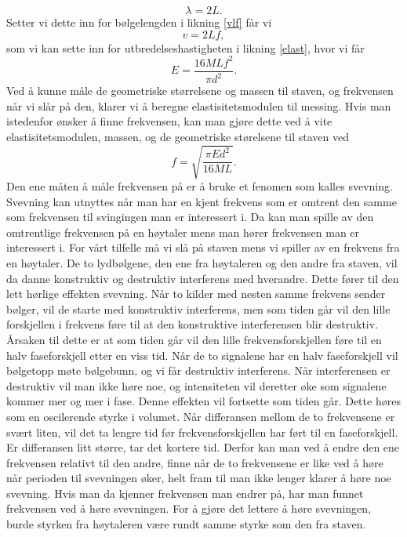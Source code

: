\documentclass[%
 reprint,
nofootinbib,
aps,
]{revtex4-1}
\begin{document}
\begin{equation}
  \lambda = 2L.
\end{equation}
Setter vi dette inn for bølgelengden i likning \eqref{vlf} får vi
\begin{equation*}
  v = 2Lf,
\end{equation*}
som vi kan sette inn for utbredelseshastigheten i likning \eqref{elast}, hvor vi får
\begin{equation}
  E = \frac{16MLf^2}{\pi d^2}. \label{young5}
\end{equation}
Ved å kunne måle de geometriske størrelsene og massen til staven, og frekvensen når vi slår på den, klarer vi å beregne elastisitetsmodulen til messing. Hvis man istedenfor ønsker å finne frekvensen, kan man gjøre dette ved å vite elastisitetsmodulen, massen, og de geometriske størelsene til staven ved
\begin{equation}
  f = \sqrt{\frac{\pi E d^2}{16ML}}. \label{young6}
\end{equation}
Den ene måten å måle frekvensen på er å bruke et fenomen som kalles svevning. Svevning kan utnyttes når man har en kjent frekvens som er omtrent den samme som frekvensen til svingingen man er interessert i. Da kan man spille av den omtrentlige frekvensen på en høytaler mens man hører frekvensen man er interessert i. For vårt tilfelle må vi slå på staven mens vi spiller av en frekvens fra en høytaler. De to lydbølgene, den ene fra høytaleren og den andre fra staven, vil da danne konstruktiv og destruktiv interferens med hverandre. Dette fører til den lett hørlige effekten svevning. Når to kilder med nesten samme frekvens sender bølger, vil de starte med konstruktiv interferens, men som tiden går vil den lille forskjellen i frekvens føre til at den konstruktive interferensen blir destruktiv. Årsaken til dette er at som tiden går vil den lille frekvensforskjellen føre til en halv faseforskjell etter en viss tid. Når de to signalene har en halv faseforskjell vil bølgetopp møte bølgebunn, og vi får destruktiv interferens. Når interferensen er destruktiv vil man ikke høre noe, og intensiteten vil deretter øke som signalene kommer mer og mer i fase. Denne effekten vil fortsette som tiden går. Dette høres som en oscilerende styrke i volumet. Når differansen mellom de to frekvensene er svært liten, vil det ta lengre tid før frekvensforskjellen har ført til en faseforskjell. Er differansen litt større, tar det kortere tid. Derfor kan man ved å endre den ene frekvensen relativt til den andre, finne når de to frekvensene er like ved å høre når perioden til svevningen øker, helt fram til man ikke lenger klarer å høre noe svevning. Hvis man da kjenner frekvensen man endrer på, har man funnet frekvensen ved å høre svevningen. For å gjøre det lettere å høre svevningen, burde styrken fra høytaleren være rundt samme styrke som den fra staven.
\end{document}
